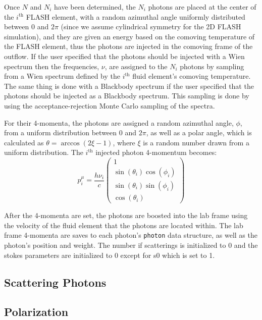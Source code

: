 \documentclass[12pt,a4paper]{article}
\begin{document}
Once $N$ and $N_i$ have been determined, the $N_i$ photons are placed at the center of the $i^\mathrm{th}$ FLASH element, with a random azimuthal angle uniformly distributed between $0$ and $2\pi$ (since we assume cylindrical symmetry for the 2D FLASH simulation), and they are given an energy based on the comoving temperature of the FLASH element, thus the photons are injected in the comoving frame of the outflow. If the user specified that the photons should be injected with a Wien spectrum then the frequencies, $\nu$, are assigned to the $N_i$ photons by sampling from a Wien spectrum defined by the $i^\mathrm{th}$ fluid element's comoving temperature. The same thing is done with a Blackbody spectrum if the user specified that the photons should be injected as a Blackbody spectrum. This sampling is done by using the acceptance-rejection Monte Carlo sampling of the spectra.

For their 4-momenta, the photons are assigned a random azimuthal angle, $\phi$, from a uniform distribution between $0$ and $2\pi$, as well as a polar angle, which is calculated as $\theta=\arccos(2\xi-1)$, where $\xi$ is a random number drawn from a uniform distribution. The $i^\mathrm{th}$ injected photon 4-momentum becomes:
\[
p^\mu_i=\frac{h\nu_i}{c}\begin{pmatrix}
1 \\ \sin(\theta_i) \cos(\phi_i) \\ \sin(\theta_i) \sin(\phi_i) \\ \cos(\theta_i)
\end{pmatrix}
\]

After the 4-momenta are set, the photons are boosted into the lab frame using the velocity of the fluid element that the photons are located within. The lab frame 4-momenta are saves to each photon's \texttt{photon} data structure, as well as the photon's position and weight. The number if scatterings is initialized to 0 and the stokes parameters are initialized to 0 except for s0 which is set to 1.




\subsection{Scattering Photons} \label{scatt}

\subsection{Polarization}\label{pol}
\end{document}
